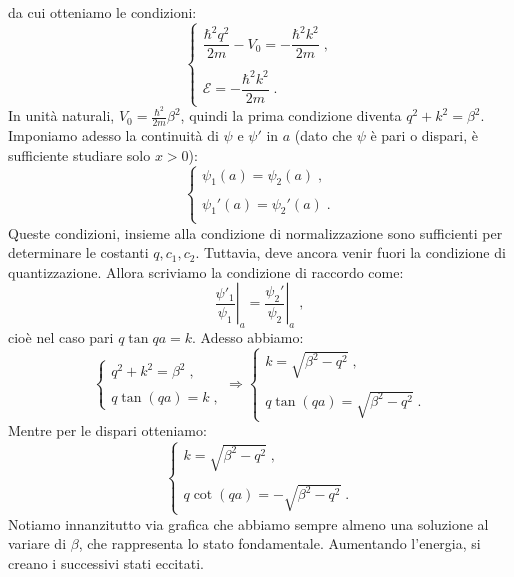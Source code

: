 \documentclass[12pt,a4paper]{report}
\theoremstyle{definition}
\numberwithin{equation}{section}
\begin{document}
da cui otteniamo le condizioni:
\begin{equation}
\begin{cases}
\dfrac{\hbar^2q^2}{2m}-V_0=-\dfrac{\hbar^2k^2}{2m}\;, \\
\\
\mathcal{E}=-\dfrac{\hbar^2k^2}{2m}\;.
\end{cases}
\end{equation}
In unità naturali, $V_0=\frac{\hbar^2}{2m}\beta^2$, quindi la prima condizione diventa $q^2+k^2=\beta^2$. Imponiamo adesso la continuità di $\psi$ e $\psi'$ in $a$ (dato che $\psi$ è pari o dispari, è sufficiente studiare solo $x>0$):
\begin{equation}
\begin{cases}
\psi_1(a)=\psi_2(a)\;, \\
\\
\psi_1'(a)=\psi_2'(a)\;. \\
\end{cases}
\end{equation}
Queste condizioni, insieme alla condizione di normalizzazione sono sufficienti per determinare le costanti $q,c_1,c_2$. Tuttavia, deve ancora venir fuori la condizione di quantizzazione. Allora scriviamo la condizione di raccordo come:
\begin{equation}
\left.\frac{\psi'_1}{\psi_1}\right|_a=\left.\frac{\psi_2'}{\psi_2}\right|_a\;,
\end{equation}
cioè nel caso pari $q\tan qa=k$. Adesso abbiamo:
\begin{equation}
\begin{cases}
q^2+k^2=\beta^2\;, \\
\\
q\tan(qa)=k\;,
\end{cases} \Longrightarrow
\begin{cases}
k=\sqrt{\beta^2-q^2}\;, \\
\\
q\tan(qa)=\sqrt{\beta^2-q^2}\;.
\end{cases}
\end{equation}
Mentre per le dispari otteniamo:
\begin{equation}
\begin{cases}
k=\sqrt{\beta^2-q^2}\;, \\
\\
q \cot(qa) =-\sqrt{\beta^2-q^2}\;.
\end{cases}
\end{equation}
Notiamo innanzitutto via grafica che abbiamo sempre almeno una soluzione al variare di $\beta$, che rappresenta lo stato fondamentale. Aumentando l'energia, si creano i successivi stati eccitati. \\
\end{document}
